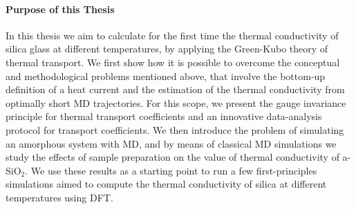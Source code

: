 \medskip

\paragraph{Purpose of this Thesis}
In this thesis we aim to calculate for the first time the thermal conductivity of silica glass at different temperatures, by applying the \abinitio Green-Kubo theory of thermal transport. 
We first show how it is possible to overcome the conceptual and methodological problems mentioned above, that involve the bottom-up definition of a heat current and the estimation of the thermal conductivity from optimally short MD trajectories. 
For this scope, we present the gauge invariance principle for thermal transport coefficients and an innovative data-analysis protocol for transport coefficients. 
We then introduce the problem of simulating an amorphous system with MD, and by means of classical MD simulations we study the effects of sample preparation on the value of thermal conductivity of a-SiO$_2$. 
We use these results as a starting point to run a few first-principles simulations aimed to compute the thermal conductivity of silica at different temperatures using DFT. 


